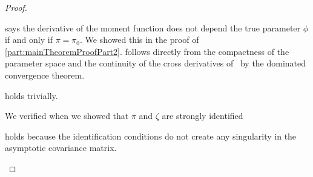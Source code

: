 \documentclass[11pt, letterpaper, twoside, final]{article}
\begin{document}
\begin{appendices}
\begin{proof}
\begin{proofpart}
     says the derivative of the moment function does not depend the true parameter $\phi$ if
    and only if  $\pi =  \pi_0$. 
    We showed this in the proof of \cref{part:mainTheoremProofPart2}.
     follows directly from the compactness of the parameter space and the continuity of the
    cross derivatives of \popmom\ by the dominated convergence theorem.

\end{proofpart}

\begin{proofpart}
    \label{mainTheoremProofPart4}
   
     holds trivially.

    We verified  when we showed that $\pi$ and $\zeta$ are strongly identified

     holds because the identification conditions do not create any singularity in the
    asymptotic covariance matrix. 

\end{proofpart}

\end{proof}





\end{appendices}
\end{document}
